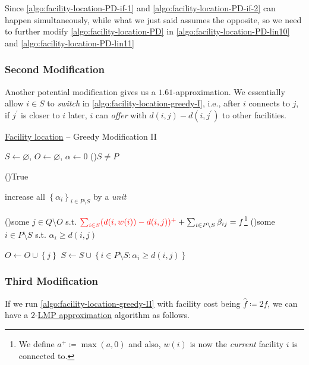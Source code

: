 \begin{remark}
	Since \autoref{algo:facility-location-PD-if-1} and \autoref{algo:facility-location-PD-if-2} can happen simultaneously, while what we just said assumes the opposite, so we need to further modify \autoref{algo:facility-location-PD} in \autoref{algo:facility-location-PD-lin10} and \autoref{algo:facility-location-PD-lin11}
\end{remark}

\subsubsection{Second Modification}
Another potential modification gives us a \(1.61\)-approximation. We essentially allow \(i\in S\) to \emph{switch} in \autoref{algo:facility-location-greedy-I}, i.e., after \(i\) connects to \(j\), if \(j^\prime \) is closer to \(i\) later, \(i\) can \emph{offer} with \(d(i, j) - d(i, j^\prime )\) to other facilities.

\begin{algorithm}[H]\label{algo:facility-location-greedy-II}
	\DontPrintSemicolon
	\caption{\hyperref[prb:facility-location]{Facility location} -- Greedy Modification II}
	\BlankLine
	\(S\gets \varnothing \), \(O\gets \varnothing \), \(\alpha \gets 0\) 
	\;
	\While(){\(S \neq P\)}{
	\While(){\textsf{True}}{
	increase all \(\left\{ \alpha _i \right\}_{i\in P\setminus S} \) by a \emph{unit}

	\If(){some \(j\in Q\setminus O\) s.t. \(\mathcolor{red}{\sum_{i\in S} (d(i, w(i)) - d(i, j))^+ } + \sum_{i\in P\setminus S} \beta _{ij} = f\)\footnote{We define \(a^+ \coloneqq \max (a, 0)\) and also, \(w(i)\) is now the \emph{current} facility \(i\) is connected to.}}{
			\Break
		}
		\If(){some \(i\in P\setminus S\) s.t. \(\alpha_i \geq d(i, j)\)}{
			\Break
		}
	}
	\(O\gets O \cup \left\{ j \right\} \)
	\(S\gets S \cup \left\{ i\in P\setminus S\colon \alpha _i \geq d(i, j)\right\} \)
	}
	\;
\end{algorithm}

\subsubsection{Third Modification}
If we run \autoref{algo:facility-location-greedy-II} with facility cost being \(\hat{f} \coloneqq 2f\), we can have a \(2\)-\hyperref[def:LMP]{LMP approximation} algorithm as follows.

